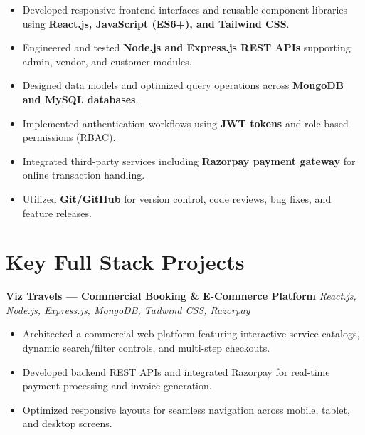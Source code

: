 \documentclass[a4paper,10pt]{article}
\begin{document}
\begin{itemize}

    \item Developed responsive frontend interfaces and reusable component libraries using \textbf{React.js, JavaScript (ES6+), and Tailwind CSS}.

    \item Engineered and tested \textbf{Node.js and Express.js REST APIs} supporting admin, vendor, and customer modules.

    \item Designed data models and optimized query operations across \textbf{MongoDB and MySQL databases}.

    \item Implemented authentication workflows using \textbf{JWT tokens} and role-based permissions (RBAC).

    \item Integrated third-party services including \textbf{Razorpay payment gateway} for online transaction handling.

    \item Utilized \textbf{Git/GitHub} for version control, code reviews, bug fixes, and feature releases.

\end{itemize}

\section*{Key Full Stack Projects}

\textbf{Viz Travels --- Commercial Booking \& E-Commerce Platform}
\hfill
\textit{React.js, Node.js, Express.js, MongoDB, Tailwind CSS, Razorpay}

\begin{itemize}

    \item Architected a commercial web platform featuring interactive service catalogs, dynamic search/filter controls, and multi-step checkouts.

    \item Developed backend REST APIs and integrated Razorpay for real-time payment processing and invoice generation.

    \item Optimized responsive layouts for seamless navigation across mobile, tablet, and desktop screens.

\end{itemize}
\end{document}
